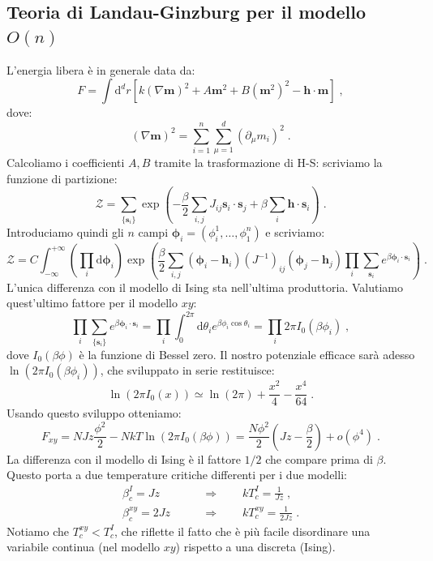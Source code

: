 \documentclass[10pt,a4paper]{report}
\theoremstyle{definition}
\numberwithin{equation}{section}
\newcommand{\diff}[1][]{\mathrm{d}#1}
\newcommand{\zpart}{\mathcal{Z}}
\begin{document}
\subsection{Teoria di Landau-Ginzburg per il modello $O(n)$}
L'energia libera è in generale data da:
\begin{equation}
F=\int\diff^d{r}\left[k(\nabla\mathbf{m})^2+A\mathbf{m}^2+B(\mathbf{m}^2)^2-\mathbf{h}\cdot\mathbf{m}\right]\;,
\end{equation}
dove:
$$
(\nabla\mathbf{m})^2=\sum_{i=1}^n\sum_{\mu=1}^d(\partial_{\mu}m_i)^2\;.
$$
Calcoliamo i coefficienti $A,B$ tramite la trasformazione di H-S: scriviamo la funzione di partizione:
\begin{equation}
\zpart=\sum_{\{\mathbf{s}_i\}}\exp\left(-\frac{\beta}{2}\sum_{i,j}J_{ij}\mathbf{s}_i\cdot\mathbf{s}_j+\beta\sum_i\mathbf{h}\cdot \mathbf{s}_i\right)\;.
\end{equation}
Introduciamo quindi gli $n$ campi $\boldsymbol{\phi}_i=(\phi_i^1,\ldots,\phi_1^n)$ e scriviamo:
\begin{equation}
\zpart= C\int_{-\infty}^{+\infty}\left(\prod_i\diff{\boldsymbol{\phi}_i}\right)\exp\left(\frac{\beta}{2}\sum_{i,j}(\boldsymbol{\phi}_i-\mathbf{h}_i)(J^{-1})_{ij}(\boldsymbol{\phi}_j-\mathbf{h}_j)\prod_i\sum_{\mathbf{s}_i}e^{\beta\boldsymbol{\phi}_i\cdot\mathbf{s}_i}\right)\;.
\end{equation}
L'unica differenza con il modello di Ising sta nell'ultima produttoria. Valutiamo quest'ultimo fattore per il modello $xy$:
\begin{equation}
\prod_i\sum_{\{\mathbf{s}_i\}}e^{\beta\boldsymbol{\phi}_i\cdot\mathbf{s}_i}=\prod_i\int_0^{2\pi}\diff{\theta_i}e^{\beta\phi_i\cos\theta_i}=\prod_i2\pi I_0(\beta\phi_i)\;,
\end{equation}
dove $I_0(\beta\phi)$ è la funzione di Bessel zero. Il nostro potenziale efficace sarà adesso $\ln(2\pi I_0(\beta\phi_i))$, che sviluppato in serie restituisce:
\begin{equation}
\ln(2\pi I_0(x))\simeq \ln(2\pi)+\frac{x^2}{4}-\frac{x^4}{64}\;.
\end{equation}
Usando questo sviluppo otteniamo:
\begin{equation}
F_{xy}=NJz\frac{\phi^2}{2}-NkT\ln(2\pi I_0(\beta\phi))=\frac{N\phi^2}{2}\left(Jz-\frac{\beta}{2}\right)+o(\phi^4)\;.
\end{equation}
La differenza con il modello di Ising è il fattore $1/2$ che compare prima di $\beta$. Questo porta a due temperature critiche differenti per i due modelli:
\begin{align*}
\beta_c^I= Jz\qquad &\Longrightarrow \qquad kT_c^I=\frac{1}{Jz}\;, \\
\beta_c^{xy}=2Jz\qquad &\Longrightarrow\qquad kT_c^{xy}=\frac{1}{2Jz}\;.
\end{align*}
Notiamo che $T^{xy}_c<T^I_c$, che riflette il fatto che è più facile disordinare una variabile continua (nel modello $xy$) rispetto a una discreta (Ising).
\end{document}
